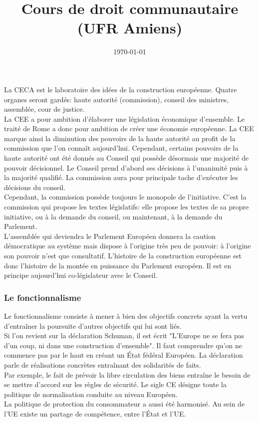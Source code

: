 \documentclass[12pt, a4paper, openany]{book}
\date{\today}
\title{Cours de droit communautaire (UFR Amiens)}
\begin{document}
La CECA est le laboratoire des idées de la construction européenne. Quatre organes seront gardés: haute autorité (commission), conseil des ministres, assemblée, cour de justice. \\
La CEE a pour ambition d'élaborer une législation économique d'ensemble. Le traité de Rome a donc pour ambition de créer une économie européenne. La CEE marque ainsi la diminution des pouvoirs de la haute autorité au profit de la commission que l'on connaît aujourd'hui. Cependant, certains pouvoirs de la haute autorité ont été donnés au Conseil qui possède désormais une majorité de pouvoir décisionnel. Le Conseil prend d'abord ses décisions à l'unanimité puis à la majorité qualifié. La commission aura pour principale tache d'exécuter les décisions du conseil. \\
Cependant, la commission possède toujours le monopole de l'initiative. C'est la commission qui propose les textes législatifs: elle propose les textes de sa propre initiative, ou à la demande du conseil, ou maintenant, à la demande du Parlement. \\
L'assemblée qui deviendra le Parlement Européen donnera la caution démocratique au système mais dispose à l'origine très peu de pouvoir: à l'origine son pouvoir n'est que consultatif. L'histoire de la construction européenne est donc l'histoire de la montée en puissance du Parlement européen. Il est en principe aujourd'hui co-législateur avec le Conseil.

\subsubsection{Le fonctionnalisme}

Le fonctionnalisme consiste à mener à bien des objectifs concrets ayant la vertu d'entraîner la poursuite d'autres objectifs qui lui sont liés. \\
Si l'on revient sur la déclaration Schuman, il est écrit "L'Europe ne se fera pas d'un coup, ni dans une construction d'ensemble". Il faut comprendre qu'on ne commence pas par le haut en créant un État fédéral Européen. La déclaration parle de réalisations concrètes entraînant des solidarités de faits. \\
Par exemple, le fait de prévoir la libre circulation des biens entraîne le besoin de se mettre d'accord sur les règles de sécurité. Le sigle CE désigne toute la politique de normalisation conduite au niveau Européen. \\
La politique de protection du consommateur a aussi été harmonisé. Au sein de l'UE existe un partage de compétence, entre l'État et l'UE.
\end{document}
